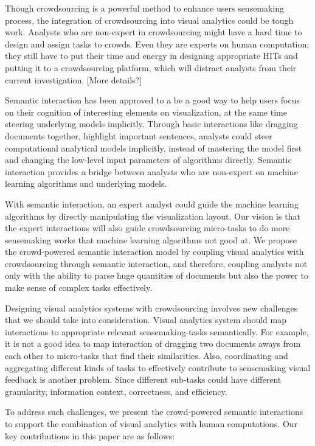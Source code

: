 \documentclass[journal]{vgtc}                %
\begin{document}
Though crowdsourcing is a powerful method to enhance users sensemaking process, the integration of crowdsourcing into visual analytics could be tough work. Analysts who are non-expert in crowdsourcing might have a hard time to design and assign tasks to crowds. Even they are experts on human computation; they still have to put their time and energy in designing appropriate HITs and putting it to a crowdsourcing platform, which will distract analysts from their current investigation. [More details?]

Semantic interaction has been approved to a be a good way to help users focus on their cognition of interesting elements on visualization, at the same time steering underlying models implicitly. Through basic interactions like dragging documents together, highlight important sentences, analysts could steer computational analytical models implicitly, instead of mastering the model first and changing the low-level input parameters of algorithms directly. Semantic interaction provides a bridge between analysts who are non-expert on machine learning algorithms and underlying models.

With semantic interaction, an expert analyst could guide the machine learning algorithms by directly manipulating the visualization layout. Our vision is that the expert interactions will also guide crowdsourcing micro-tasks to do more sensemaking works that machine learning algorithms not good at. We propose the crowd-powered semantic interaction model by coupling visual analytics with crowdsourcing through semantic interaction, and therefore, coupling analysts not only with the ability to parse huge quantities of documents but also the power to make sense of complex tasks effectively.

Designing visual analytics systems with crowdsourcing involves new challenges that we should take into consideration. Visual analytics system should map interactions to appropriate relevant sensemaking-tasks semantically. For example, it is not a good idea to map interaction of dragging two documents aways from each other to micro-tasks that find their similarities. Also, coordinating and aggregating different kinds of tasks to effectively contribute to sensemaking visual feedback is another problem. Since different sub-tasks could have different granularity, information context, correctness, and efficiency.

To address such challenges, we present the crowd-powered semantic interactions to support the combination of visual analytics with human computations. Our key contributions in this paper are as follows:
\end{document}
